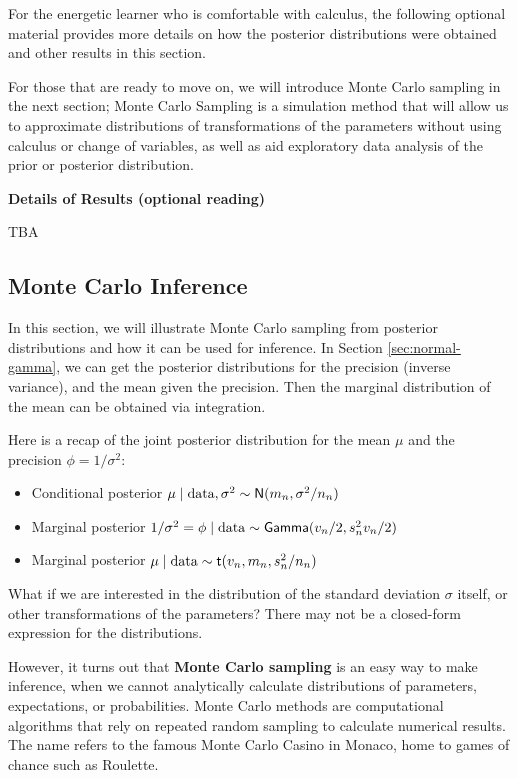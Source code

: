 \documentclass[]{book}
\providecommand{\tightlist}{%
  \setlength{\itemsep}{0pt}\setlength{\parskip}{0pt}}
\theoremstyle{definition}
\theoremstyle{definition}
\theoremstyle{definition}
\theoremstyle{remark}
\begin{document}
For the energetic learner who is comfortable with calculus, the
following optional material provides more details on how the posterior
distributions were obtained and other results in this section.

For those that are ready to move on, we will introduce Monte Carlo
sampling in the next section; Monte Carlo Sampling is a simulation
method that will allow us to approximate distributions of
transformations of the parameters without using calculus or change of
variables, as well as aid exploratory data analysis of the prior or
posterior distribution.

\textbf{Details of Results (optional reading)}

TBA

\subsection{Monte Carlo Inference}\label{sec:NG-MC}

In this section, we will illustrate Monte Carlo sampling from posterior
distributions and how it can be used for inference. In Section
\ref{sec:normal-gamma}, we can get the posterior distributions for the
precision (inverse variance), and the mean given the precision. Then the
marginal distribution of the mean can be obtained via integration.

Here is a recap of the joint posterior distribution for the mean \(\mu\)
and the precision \(\phi = 1/\sigma^2\):

\begin{itemize}
\tightlist
\item
  Conditional posterior
  \(\mu \mid \text{data}, \sigma^2 \sim \textsf{N}(m_n, \sigma^2/n_n)\)
\item
  Marginal posterior
  \(1/\sigma^2 = \phi \mid \text{data} \sim \textsf{Gamma}(v_n/2,s^2_n v_n/2)\)
\item
  Marginal posterior \(\mu \mid \text{data} \sim \textsf{t}(v_n, m_n, s^2_n/n_n)\)
\end{itemize}

What if we are interested in the distribution of the standard deviation
\(\sigma\) itself, or other transformations of the parameters? There may
not be a closed-form expression for the distributions.

However, it turns out that \textbf{Monte Carlo sampling} is an easy way
to make inference, when we cannot analytically calculate distributions
of parameters, expectations, or probabilities. Monte Carlo methods are
computational algorithms that rely on repeated random sampling to
calculate numerical results. The name refers to the famous Monte Carlo
Casino in Monaco, home to games of chance such as Roulette.
\end{document}
